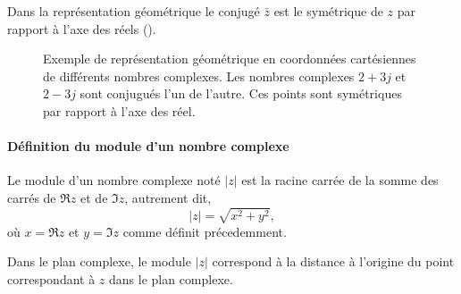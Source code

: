 Dans la représentation géométrique le conjugé $\bar{z}$ est le symétrique 
de $z$ par rapport à l'axe des réels ().


\begin{figure}[!h]
\captionsetup{width=0.8\linewidth}
\begin{center}
\end{center}
    \caption{Exemple de représentation géométrique en coordonnées cartésiennes 
    de différents nombres complexes. Les nombres complexes $2+3j$ et $2-3j$
    sont conjugués l'un de l'autre. Ces points sont symétriques par rapport à l'axe des réel.
   \label{fig-plan_complexe}}
\end{figure}

\paragraph{Définition du module d'un nombre complexe}
Le module d'un nombre complexe noté $|z|$ est la 
racine carrée de la somme des carrés de $\Re{z}$ et de $\Im{z}$, 
autrement dit, 
$$
|z|=\sqrt{x^2+y^2},
$$
où $x=\Re{z}$ et $y=\Im{z}$ comme définit précedemment.

Dans le plan complexe, le module $|z|$ correspond à la distance à l'origine du 
point correspondant à $z$ dans le plan complexe.

